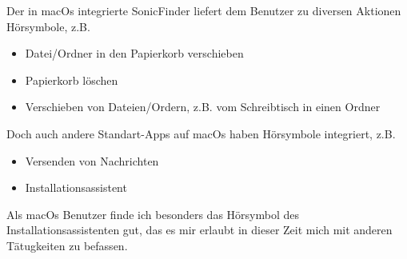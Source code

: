 Der in macOs integrierte SonicFinder liefert dem Benutzer zu diversen Aktionen
Hörsymbole, z.B.

\begin{itemize}
  \item Datei/Ordner in den Papierkorb verschieben
  \item Papierkorb löschen
  \item Verschieben von Dateien/Ordern, z.B. vom Schreibtisch in einen Ordner
\end{itemize}

Doch auch andere Standart-Apps auf macOs haben Hörsymbole integriert, z.B.

\begin{itemize}
  \item Versenden von Nachrichten
  \item Installationsassistent
\end{itemize}

Als macOs Benutzer finde ich besonders das Hörsymbol des
Installationsassistenten gut, das es mir erlaubt in dieser Zeit mich mit anderen
Tätugkeiten zu befassen.
